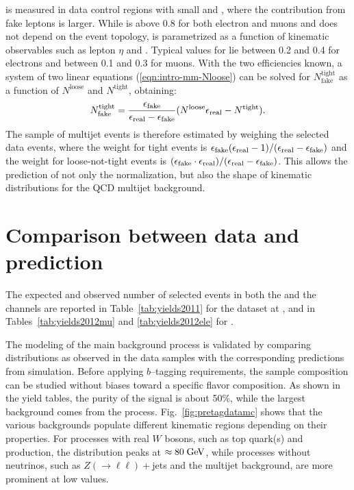 is measured in data control regions with small \met{} and \mtw{},
where the contribution from fake leptons is larger. While \effReal{}
is above 0.8 for both electron and muons and does not depend on the
event topology, \effFake{} is parametrized as a function of kinematic
observables such as lepton $\eta$ and . Typical
values for \effFake{} lie between 0.2 and 0.4 for electrons and
between 0.1 and 0.3 for muons. With the two efficiencies known, a
system of two linear equations (\ref{eqn:intro-mm-Nloose}) can be
solved for $N^{\mathrm{tight}}_\mathrm{fake}$ as a function of
$N^\mathrm{loose}$ and $N^\mathrm{tight}$, obtaining:
%                                                                                             
\begin{equation}
  N^\mathrm{tight}_\mathrm{fake}
  = \frac{\epsilon_{\mathrm{fake}}{}}
  {\epsilon_{\mathrm{real}}{} - \epsilon_{\mathrm{fake}}{}}
  (N^\mathrm{loose} \epsilon_{\mathrm{real}}{} - N^\mathrm{tight}).
  \label{eqn:intro-mm-tight_fake}
\end{equation}
%                                                                                             
The sample of multijet events is therefore estimated by weighing the
selected data events, where the weight for tight events is
$\epsilon_{\mathrm{fake}}{}(\epsilon_{\mathrm{real}}{}-1)/(\epsilon_{\mathrm{real}}{}-\epsilon_{\mathrm{fake}}{})$ and the weight for
loose-not-tight events is
$(\epsilon_{\mathrm{fake}}{}\cdot{}\epsilon_{\mathrm{real}}{})/(\epsilon_{\mathrm{real}}{}-\epsilon_{\mathrm{fake}}{})$. This allows
the prediction of not only the normalization, but also the shape of
kinematic distributions for the QCD multijet background.

\section{Comparison between data and prediction}
\label{sec:datamc}

The expected and observed number of selected events in both the
\mujets{} and the \ejets{} channels are reported in
Table~\ref{tab:yields2011} for the dataset at \seventev{}, and in
Tables~\ref{tab:yields2012mu} and \ref{tab:yields2012ele}  for \eighttev{}.



The modeling of the main background process is validated by comparing
distributions as observed in the data samples with the corresponding
predictions from simulation. 
Before applying $b$--tagging requirements, the sample composition can
be studied without biases toward a specific flavor composition. As
shown in the yield tables, the purity of the \ttbar{} signal is about
50\%, while the largest background comes from the \wjets{}
process. Fig.~\ref{fig:pretagdatamc} shows that the various
backgrounds populate different kinematic regions depending on their
properties. For processes with real $W$ bosons, such as top quark(s)
and \wjets{} production, the \mtw{} distribution peaks at
$\approx80\; \mathrm{GeV}{}$, while processes without neutrinos, such as
$Z(\to\ell\ell)+$jets and the multijet background, are more prominent
at low \met{} values.
 
